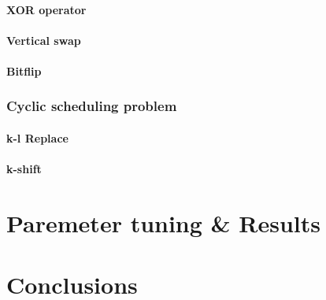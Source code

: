 \documentclass[]{article}
\begin{document}
\paragraph{XOR operator}
\paragraph{Vertical swap}
\paragraph{Bitflip}
\subsubsection{Cyclic scheduling problem}
\paragraph{k-l Replace}
\paragraph{k-shift}

\section{Paremeter tuning \& Results}


\section{Conclusions}




\end{document}
